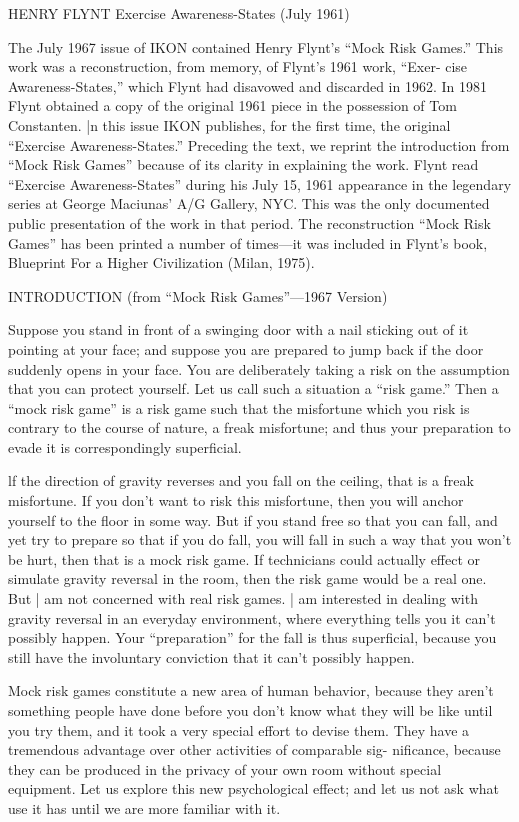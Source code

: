 HENRY FLYNT 
Exercise Awareness-States (July 1961) 


The July 1967 issue of IKON contained Henry Flynt’s “Mock Risk Games.” 
This work was a reconstruction, from memory, of Flynt’s 1961 work, “Exer- 
cise Awareness-States,” which Flynt had disavowed and discarded in 1962. 
In 1981 Flynt obtained a copy of the original 1961 piece in the possession 
of Tom Constanten. |n this issue IKON publishes, for the first time, the 
original “Exercise Awareness-States.” Preceding the text, we reprint the 
introduction from “Mock Risk Games” because of its clarity in explaining the 
work. Flynt read “Exercise Awareness-States” during his July 15, 1961 
appearance in the legendary series at George Maciunas’ A/G Gallery, NYC. 
This was the only documented public presentation of the work in that period. 
The reconstruction “Mock Risk Games” has been printed a number of 
times—it was included in Flynt’s book, Blueprint For a Higher Civilization 
(Milan, 1975). 


INTRODUCTION (from “Mock Risk Games”—1967 Version) 


Suppose you stand in front of a swinging door with a nail sticking out of it 
pointing at your face; and suppose you are prepared to jump back if the door 
suddenly opens in your face. You are deliberately taking a risk on the 
assumption that you can protect yourself. Let us call such a situation a “risk 
game.” Then a “mock risk game” is a risk game such that the misfortune 
which you risk is contrary to the course of nature, a freak misfortune; and 
thus your preparation to evade it is correspondingly superficial. 

lf the direction of gravity reverses and you fall on the ceiling, that is a freak 
misfortune. If you don’t want to risk this misfortune, then you will anchor 
yourself to the floor in some way. But if you stand free so that you can fall, 
and yet try to prepare so that if you do fall, you will fall in such a way that 
you won't be hurt, then that is a mock risk game. If technicians could actually 
effect or simulate gravity reversal in the room, then the risk game would be 
a real one. But | am not concerned with real risk games. | am interested in 
dealing with gravity reversal in an everyday environment, where everything 
tells you it can’t possibly happen. Your “preparation” for the fall is thus 
superficial, because you still have the involuntary conviction that it can’t 
possibly happen. 

Mock risk games constitute a new area of human behavior, because they 
aren't something people have done before you don’t know what they will be 
like until you try them, and it took a very special effort to devise them. They 
have a tremendous advantage over other activities of comparable sig- 
nificance, because they can be produced in the privacy of your own room 
without special equipment. Let us explore this new psychological effect; and 
let us not ask what use it has until we are more familiar with it. 


